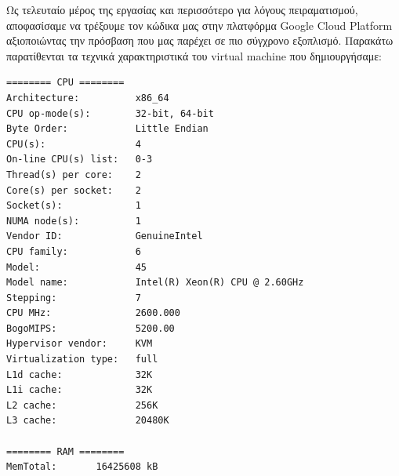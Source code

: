 \noindent Ως τελευταίο μέρος της εργασίας και περισσότερο για λόγους πειραματισμού, αποφασίσαμε να τρέξουμε τον κώδικα μας στην πλατφόρμα Google Cloud Platform αξιοποιώντας την πρόσβαση που μας παρέχει σε πιο σύγχρονο εξοπλισμό. Παρακάτω παρατίθενται τα τεχνικά χαρακτηριστικά του virtual machine που δημιουργήσαμε:

\begin{verbatim}
======== CPU ========
Architecture:          x86_64
CPU op-mode(s):        32-bit, 64-bit
Byte Order:            Little Endian
CPU(s):                4
On-line CPU(s) list:   0-3
Thread(s) per core:    2
Core(s) per socket:    2
Socket(s):             1
NUMA node(s):          1
Vendor ID:             GenuineIntel
CPU family:            6
Model:                 45
Model name:            Intel(R) Xeon(R) CPU @ 2.60GHz
Stepping:              7
CPU MHz:               2600.000
BogoMIPS:              5200.00
Hypervisor vendor:     KVM
Virtualization type:   full
L1d cache:             32K
L1i cache:             32K
L2 cache:              256K
L3 cache:              20480K

======== RAM ========
MemTotal:       16425608 kB


\end{verbatim}
